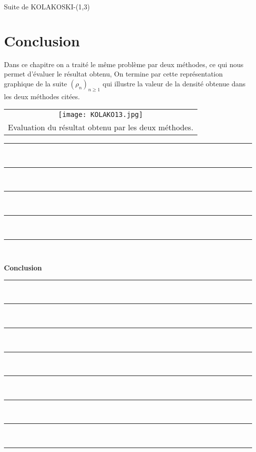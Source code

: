 \documentclass[12pt,a4paper,oneside]{book}
\begin{document}
\begin{titlepage}
\begin{chapter}{Suite de KOLAKOSKI-(1,3)}
\section{Conclusion}
\par Dans ce chapitre on a traité le m\^eme problème par deux méthodes, ce qui nous permet d'évaluer le résultat obtenu, On termine par cette représentation graphique de la suite $(\rho_n)_{n \geq 1}$ qui illustre la valeur de la densité obtenue dans les deux méthodes citées.\\ 
\begin{center}
 \begin{tabular}{c} 
\texttt{[image: KOLAKO13.jpg]} \\ 
Evaluation du résultat obtenu par les deux méthodes. 
\end{tabular}
 \end{center} 
\end{chapter}
\newpage                  
\rule{1\textwidth}{0pt}\\ 
\rule{1\textwidth}{0pt}\\ 
\rule{1\textwidth}{0pt}\\ 
\rule{1\textwidth}{0pt}\\
\rule{1\textwidth}{0pt}\\
    \begin{center}
          {\Huge \textbf{Conclusion}}
    \end{center}
\rule{1\textwidth}{0pt} \\ 
\rule{1\textwidth}{0pt} \\
 \rule{1\textwidth}{0pt} \\
 \rule{1\textwidth}{0pt} \\
  \rule{1\textwidth}{0pt} \\ 
  \rule{1\textwidth}{0pt} \\
   \rule{1\textwidth}{0pt} \\ 
   \rule{1\textwidth}{0pt} \\

\end{titlepage}
\end{document}
